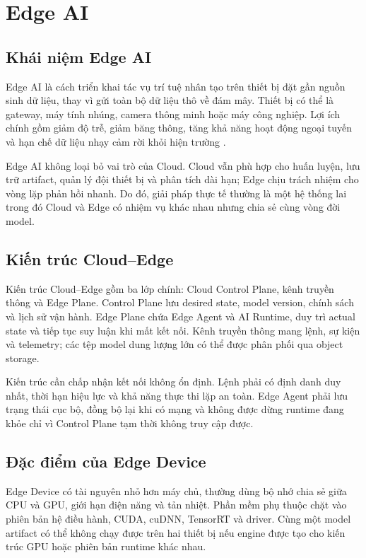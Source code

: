 \section{Edge AI}

\subsection{Khái niệm Edge AI}

Edge AI là cách triển khai tác vụ trí tuệ nhân tạo trên thiết bị đặt gần nguồn sinh
dữ liệu, thay vì gửi toàn bộ dữ liệu thô về đám mây. Thiết bị có thể là gateway,
máy tính nhúng, camera thông minh hoặc máy công nghiệp. Lợi ích chính gồm giảm
độ trễ, giảm băng thông, tăng khả năng hoạt động ngoại tuyến và hạn chế dữ liệu
nhạy cảm rời khỏi hiện trường \cite{shi2016,satya2017}.

Edge AI không loại bỏ vai trò của Cloud. Cloud vẫn phù hợp cho huấn luyện, lưu
trữ artifact, quản lý đội thiết bị và phân tích dài hạn; Edge chịu trách nhiệm cho
vòng lặp phản hồi nhanh. Do đó, giải pháp thực tế thường là một hệ thống lai trong
đó Cloud và Edge có nhiệm vụ khác nhau nhưng chia sẻ cùng vòng đời model.

\subsection{Kiến trúc Cloud--Edge}

Kiến trúc Cloud--Edge gồm ba lớp chính: Cloud Control Plane, kênh truyền thông
và Edge Plane. Control Plane lưu desired state, model version, chính sách và lịch
sử vận hành. Edge Plane chứa Edge Agent và AI Runtime, duy trì actual state và
tiếp tục suy luận khi mất kết nối. Kênh truyền thông mang lệnh, sự kiện và
telemetry; các tệp model dung lượng lớn có thể được phân phối qua object storage.

Kiến trúc cần chấp nhận kết nối không ổn định. Lệnh phải có định danh duy nhất,
thời hạn hiệu lực và khả năng thực thi lặp an toàn. Edge Agent phải lưu trạng thái
cục bộ, đồng bộ lại khi có mạng và không được dừng runtime đang khỏe chỉ vì
Control Plane tạm thời không truy cập được.

\subsection{Đặc điểm của Edge Device}

Edge Device có tài nguyên nhỏ hơn máy chủ, thường dùng bộ nhớ chia sẻ giữa CPU
và GPU, giới hạn điện năng và tản nhiệt. Phần mềm phụ thuộc chặt vào phiên bản
hệ điều hành, CUDA, cuDNN, TensorRT và driver. Cùng một model artifact có thể
không chạy được trên hai thiết bị nếu engine được tạo cho kiến trúc GPU hoặc
phiên bản runtime khác nhau.


